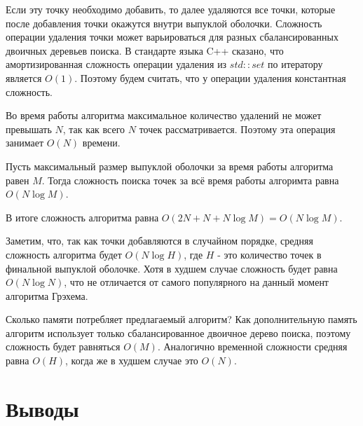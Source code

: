 
Если эту точку необходимо добавить, то далее удаляются все точки, которые после добавления точки окажутся внутри выпуклой оболочки. Сложность операции удаления точки может варьироваться для разных сбалансированных двоичных деревьев поиска. В стандарте языка C++ сказано, что амортизированная сложность операции удаления из $std::set$ по итератору является $O(1)$. Поэтому будем считать, что у операции удаления константная сложность.

Во время работы алгоритма максимальное количество удалений не может превышать $N$, так как всего $N$ точек рассматривается. Поэтому эта операция занимает $O(N)$ времени.

Пусть максимальный размер выпуклой оболочки за время работы алгоритма равен $M$. Тогда сложность поиска точек за всё время работы алгоримта равна $O(N \log M)$.

В итоге сложность алгоритма равна $O(2 N + N + N \log M) = O(N \log M)$.

Заметим, что, так как точки добавляются в случайном порядке, средняя сложность алгоритма будет $O(N \log H)$, где $H$ - это количество точек в финальной выпуклой оболочке. Хотя в худшем случае сложность будет равна $O(N \log N)$, что не отличается от самого популярного на данный момент алгоритма Грэхема.

Сколько памяти потребляет предлагаемый алгоритм? Как дополнительную память алгоритм использует только сбалансированное двоичное дерево поиска, поэтому сложность будет равняться $O(M)$. Аналогично временной сложности средняя равна $O(H)$, когда же в худшем случае это $O(N)$.


\section{Выводы} \label{subsect2_5}

